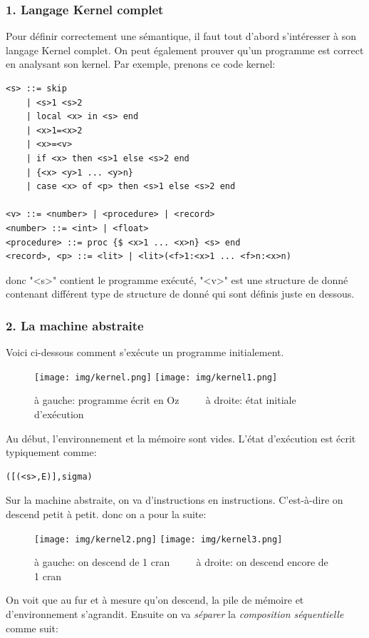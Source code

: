 \documentclass{report}
\begin{document}
\subsubsection{1. Langage Kernel complet}
Pour définir correctement une sémantique, il faut tout d'abord s'intéresser à son langage Kernel complet. On peut également prouver qu'un programme est correct en analysant son kernel. Par exemple, prenons ce code kernel:
\begin{lstlisting}
<s> ::= skip 
	| <s>1 <s>2 
	| local <x> in <s> end 
	| <x>1=<x>2 
	| <x>=<v> 
	| if <x> then <s>1 else <s>2 end 
	| {<x> <y>1 ... <y>n} 
	| case <x> of <p> then <s>1 else <s>2 end

<v> ::= <number> | <procedure> | <record>  
<number> ::= <int> | <float> 
<procedure> ::= proc {$ <x>1 ... <x>n} <s> end
<record>, <p> ::= <lit> | <lit>(<f>1:<x>1 ... <f>n:<x>n)
\end{lstlisting}
donc "<s>" contient le programme exécuté, "<v>" est une structure de donné contenant différent type de structure de donné qui sont définis juste en dessous. 

\subsubsection{2. La machine abstraite}
Voici ci-dessous comment s'exécute un programme initialement.

\begin{figure}[H]
\centering
\texttt{[image: img/kernel.png]}
\texttt{[image: img/kernel1.png]}
\caption{à gauche: programme écrit en Oz $\qquad$ à droite: état initiale d'exécution}
\end{figure}
Au début, l'environnement et la mémoire sont vides. L'état d'exécution est écrit typiquement comme:
\begin{lstlisting}
([(<s>,E)],sigma)
\end{lstlisting} %
Sur la machine abstraite, on va d'instructions en instructions. C'est-à-dire on descend petit à petit.
donc on a pour la suite:
\begin{figure}[H]
\centering
\texttt{[image: img/kernel2.png]}
\texttt{[image: img/kernel3.png]}
\caption{à gauche: on descend de 1 cran $\qquad$ à droite: on descend encore de 1 cran}
\end{figure}
On voit que au fur et à mesure qu'on descend, la pile de mémoire et d'environnement s'agrandit. Ensuite on va \textit{séparer} la \textit{composition séquentielle} comme suit:
\end{document}
